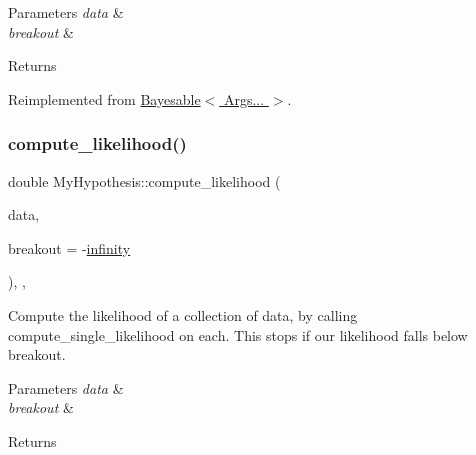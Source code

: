 \begin{DoxyParams}{Parameters}
{\em data} & \\
\hline
{\em breakout} & \\
\hline
\end{DoxyParams}
\begin{DoxyReturn}{Returns}

\end{DoxyReturn}


Reimplemented from \hyperlink{class_bayesable_af9547335ae15a5068b10d29aee5056ae}{Bayesable$<$ Args... $>$}.

\mbox{\label{class_my_hypothesis_a557264ea2caf1b983d621a112cb762c6}} 
\subsubsection{\texorpdfstring{compute\+\_\+likelihood()}{compute\_likelihood()}\hspace{0.1cm}{\footnotesize\ttfamily [2/2]}}
{\footnotesize\ttfamily double My\+Hypothesis\+::compute\+\_\+likelihood (\begin{DoxyParamCaption}\item[{const \hyperlink{class_bayesable_a70a593a67c7d43239ecc06bb4fd06a6b}{t\+\_\+data} \&}]{data,  }\item[{const double}]{breakout = {\ttfamily -\/\hyperlink{_numerics_8h_a1bb1e42ae1b40cad6e99da0aab8a5576}{infinity}} }\end{DoxyParamCaption})\hspace{0.3cm}{\ttfamily [inline]}, {\ttfamily [override]}, {\ttfamily [virtual]}}



Compute the likelihood of a collection of data, by calling compute\+\_\+single\+\_\+likelihood on each. This stops if our likelihood falls below breakout. 


\begin{DoxyParams}{Parameters}
{\em data} & \\
\hline
{\em breakout} & \\
\hline
\end{DoxyParams}
\begin{DoxyReturn}{Returns}

\end{DoxyReturn}


